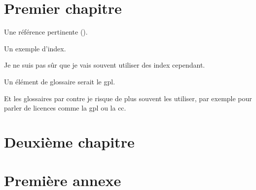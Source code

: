\documentclass[
    fontsize=10pt, %
    twoside=true, %
    open=any, %
    secnumdepth=1, %
]{kaobook}
\begin{document}
\chapter{Premier chapitre}

Une référence pertinente ().

Un exemple d'index.

Je ne suis pas sûr que je vais souvent utiliser des
index cependant.

Un élément de glossaire serait le \acrshort{gpl}.

Et les glossaires par contre je risque de plus souvent les utiliser, par exemple
pour parler de licences comme la \acrlong{gpl} ou la \acrshort{cc}.


\chapter{Deuxième chapitre}

\appendix %


\chapter{Première annexe}


\backmatter %



\printbibliography[heading=bibintoc, title=Bibliography, prenote=bibnote] %



\printindex %
\printglossary %
\end{document}
